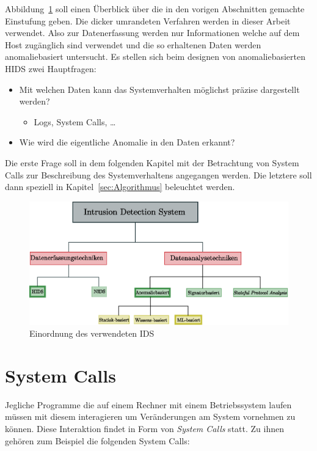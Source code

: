         Abbildung~\ref{fig:IDSOverview} soll einen Überblick über die in den vorigen Abschnitten gemachte Einstufung geben.
        Die dicker umrandeten Verfahren werden in dieser Arbeit verwendet.
        Also zur Datenerfassung werden nur Informationen welche auf dem Host zugänglich sind verwendet 
        und die so erhaltenen Daten werden anomaliebasiert untersucht.
        Es stellen sich beim designen von anomaliebasierten HIDS zwei Hauptfragen:
        \begin{itemize}
            \item Mit welchen Daten kann das Systemverhalten möglichst präzise dargestellt werden?
                \begin{itemize}
                    \item Logs, System Calls, \dots
                \end{itemize}
            \item Wie wird die eigentliche Anomalie in den Daten erkannt?
        \end{itemize}
        Die erste Frage soll in dem folgenden Kapitel mit der Betrachtung von System Calls zur Beschreibung des Systemverhaltens angegangen werden.
        Die letztere soll dann speziell in Kapitel~\ref{sec:Algorithmus} beleuchtet werden.

        \begin{figure}[ht]
            \centering
            \includegraphics[width=1\textwidth]{images/Illustrationen/IDS/IDSOverview}
            \caption{Einordnung des verwendeten IDS}
            \label{fig:IDSOverview}
        \end{figure}

    \section{System Calls}
    \label{sec:syscalls}
        Jegliche Programme die auf einem Rechner mit einem Betriebssystem laufen müssen mit diesem interagieren um Veränderungen am System vornehmen zu können.
        Diese Interaktion findet in Form von \textit{System Calls}  statt.
        Zu ihnen gehören zum Beispiel die folgenden System Calls:

